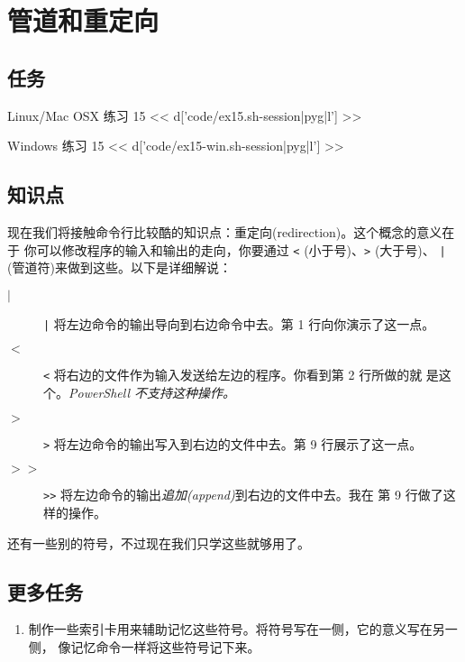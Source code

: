 \chapter{管道和重定向}

\section{任务}

\begin{code}{Linux/Mac OSX 练习 15}
<< d['code/ex15.sh-session|pyg|l'] >>
\end{code}

\begin{code}{Windows 练习 15}
<< d['code/ex15-win.sh-session|pyg|l'] >>
\end{code}

\section{知识点}

现在我们将接触命令行比较酷的知识点：重定向(redirection)。这个概念的意义在于
你可以修改程序的输入和输出的走向，你要通过  \verb|<| (小于号)、\verb|>| (大于号)、
\verb,|, (管道符)来做到这些。以下是详细解说：

\begin{description}
\item[$|$] \verb,|, 将左边命令的输出导向到右边命令中去。第 1 行向你演示了这一点。
\item[$<$] \verb|<| 将右边的文件作为输入发送给左边的程序。你看到第 2 行所做的就
   是这个。\emph{PowerShell 不支持这种操作。}
\item[$>$] \verb|>| 将左边命令的输出写入到右边的文件中去。第 9 行展示了这一点。
\item[$>>$] \verb|>>| 将左边命令的输出\emph{追加(append)}到右边的文件中去。我在
   第 9 行做了这样的操作。
\end{description}

还有一些别的符号，不过现在我们只学这些就够用了。

\section{更多任务}

\begin{enumerate}
\item 制作一些索引卡用来辅助记忆这些符号。将符号写在一侧，它的意义写在另一侧，
    像记忆命令一样将这些符号记下来。
\end{enumerate}


